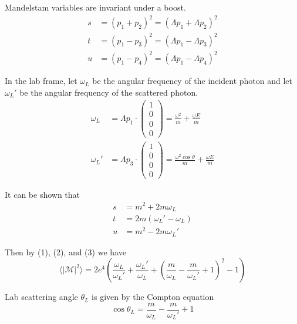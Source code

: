 Mandelstam variables are invariant under a boost.
\begin{equation*}
\begin{aligned}
s&=(p_1+p_2)^2=(\Lambda p_1+\Lambda p_2)^2
\\
t&=(p_1-p_3)^2=(\Lambda p_1-\Lambda p_3)^2
\\
u&=(p_1-p_4)^2=(\Lambda p_1-\Lambda p_4)^2
\end{aligned}
\end{equation*}

In the lab frame, let $\omega_L$ be the angular frequency of the incident photon
and let $\omega_L'$ be the angular frequency of the scattered photon.
\begin{equation*}
\begin{aligned}
\omega_L&=\Lambda p_1\cdot
\begin{pmatrix}1\\0\\0\\0\end{pmatrix}
=\frac{\omega^2}{m}+\frac{\omega E}{m}
\\[1ex]
\omega_L'&=\Lambda p_3\cdot
\begin{pmatrix}1\\0\\0\\0\end{pmatrix}
=\frac{\omega^2\cos\theta}{m}+\frac{\omega E}{m}
\end{aligned}
\end{equation*}

It can be shown that
\begin{equation*}
\begin{aligned}
s&=m^2+2m\omega_L
\\
t&=2m(\omega_L' - \omega_L)
\\
u&=m^2-2 m \omega_L'
\end{aligned}
\tag{3}
\end{equation*}

Then by (1), (2), and (3) we have
\begin{equation*}
\langle|\mathcal{M}|^2\rangle=
2e^4\left(
\frac{\omega_L}{\omega_L'}+\frac{\omega_L'}{\omega_L}
+\left(\frac{m}{\omega_L}-\frac{m}{\omega_L'}+1\right)^2-1
\right)
\end{equation*}

Lab scattering angle $\theta_L$ is given by the Compton equation
\begin{equation*}
\cos\theta_L=\frac{m}{\omega_L}-\frac{m}{\omega_L'}+1
\end{equation*}

